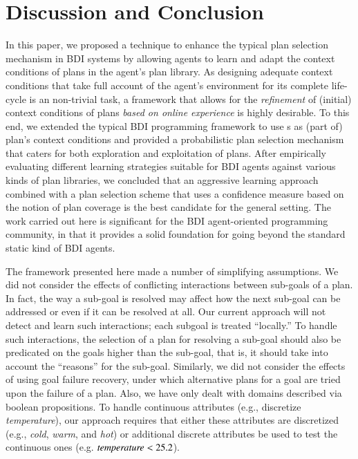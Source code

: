 \section{Discussion and Conclusion}\label{sec:discussion}

In this paper, we proposed a technique to enhance the typical plan selection
mechanism in BDI systems by allowing agents to learn and adapt the context
conditions of plans in the agent's plan library.
As designing adequate context conditions that take full account of the agent's
environment for its complete life-cycle is an non-trivial task, a framework that
allows for the \emph{refinement} of (initial) context conditions of plans
\textit{based on online experience} is highly desirable.
To this end, we extended the typical BDI programming framework to use \dt{}s as
(part of) plan's context conditions and provided a probabilistic plan selection
mechanism that caters for both exploration and exploitation of plans.
After empirically evaluating different learning strategies suitable for BDI
agents against various kinds of plan libraries, we concluded that an aggressive
learning approach combined with a plan selection scheme that uses a confidence
measure based on the notion of plan coverage is the best candidate for the
general setting.
The work carried out here is significant for the BDI agent-oriented programming
community, in that it provides a solid foundation for going beyond the standard
static kind of BDI agents.

The framework presented here made a number of simplifying assumptions.
We did not consider the effects of conflicting interactions between sub-goals of
a plan. In fact, the way a sub-goal is resolved may affect how the next sub-goal
can be addressed or even if it can be resolved at all.
Our current approach will not detect and learn such interactions; each subgoal
is treated ``locally.'' To handle such interactions, the selection of a plan for 
resolving a sub-goal should also be predicated on the goals higher than the
sub-goal, that is, it should take into account the ``reasons'' for the sub-goal.
Similarly, we did not consider the effects of using goal failure recovery, under
which alternative plans for a goal are tried upon the failure of a plan.
Also, we have only dealt with domains described via boolean propositions. To
handle continuous attributes (e.g., discretize \emph{temperature}), our approach
requires that either these attributes are discretized (e.g., \emph{cold}, \emph{warm},
and \emph{hot}) or additional discrete
attributes be used to test the continuous ones (e.g. $\emph{temperature} < 25.2$).


